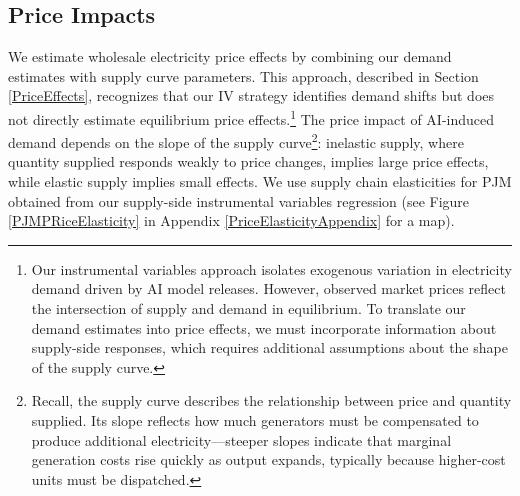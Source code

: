 \documentclass[sigconf,authordraft]{acmart}
\newcommand{\nb}[1]{\textcolor{blue}{NB[#1]}}
\begin{document}
\subsection{Price Impacts}
\label{subsec:price-effects-results}

We estimate wholesale electricity price effects by combining our demand estimates with supply curve parameters. This approach, described in Section \ref{PriceEffects}, recognizes that our IV strategy identifies demand shifts but does not directly estimate equilibrium price effects.\footnote{Our instrumental variables approach isolates exogenous variation in electricity demand driven by AI model releases. However, observed market prices reflect the intersection of supply and demand in equilibrium. To translate our demand estimates into price effects, we must incorporate information about supply-side responses, which requires additional assumptions about the shape of the supply curve.} The price impact of AI-induced demand depends on the slope of the supply curve\footnote{Recall, the supply curve describes the relationship between price and quantity supplied. Its slope reflects how much generators must be compensated to produce additional electricity—steeper slopes indicate that marginal generation costs rise quickly as output expands, typically because higher-cost units must be dispatched.}: inelastic supply, where quantity supplied responds weakly to price changes, implies large price effects, while elastic supply implies small effects. We use supply chain elasticities for PJM obtained from our supply-side instrumental variables regression (see Figure \ref{PJMPRiceElasticity} in Appendix \ref{PriceElasticityAppendix} for a map). 
\end{document}
